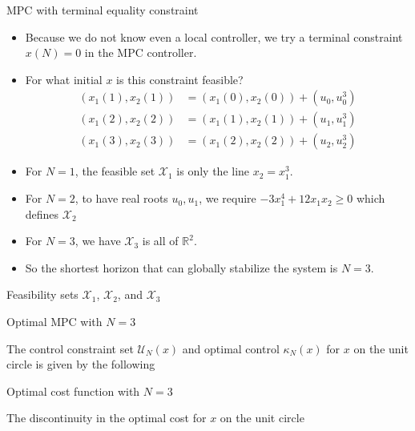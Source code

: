 \documentclass{beamer}
\newcommand{\bbR}{\mathbb{R}}
\begin{document}
\begin{frame}{MPC with terminal equality constraint}

\begin{itemize}
\item Because we do \alert{not} know even a \alert{local controller}, we try a terminal
constraint $x(N)=0$ in the MPC controller. 
\item For what initial $x$ is this constraint feasible?
\begin{align*}
(x_1(1), x_2(1)) &= (x_1(0), x_2(0)) + (u_0, u^3_0) \\
(x_1(2), x_2(2)) &= (x_1(1),x_2(1)) + (u_1, u_1^3) \\
(x_1(3), x_2(3)) &= (x_1(2), x_2(2)) + (u_2, u_2^3)
\end{align*}

\item  For $N=1$, the feasible set $\mathcal{X}_1$ is only the line $x_2 = x_1^3$. 
\item For $N=2$, to have real roots $u_0, u_1$, we require 
$−3x_1^4 + 12x_1x_2 \geq 0$ which defines $\mathcal{X}_2$
\item For $N=3$, we have $\mathcal{X}_3$ is all of $\bbR^2$. 
\item So the shortest horizon that can globally stabilize the system
  is $N=3$.
\end{itemize}
\end{frame}


\begin{frame}{Feasibility sets $\mathcal{X}_1$, $\mathcal{X}_2$, and
  $\mathcal{X}_3$}
\centerline{\resizebox{0.8\textwidth}{!}{}}

\end{frame}


\begin{frame}{Optimal MPC with $N=3$}

The control constraint set $\mathcal{U}_N(x)$  and optimal
control $\kappa_N(x)$ for $x$ on the unit
circle is given by the following \citep[p. 105]{rawlings:mayne:2009} 

\centerline{\resizebox{0.8\textwidth}{!}{}}

\end{frame}


\begin{frame}{Optimal cost function with $N=3$}

The discontinuity in the optimal cost for $x$ on  the unit circle

\centerline{\resizebox{0.8\textwidth}{!}{}}

\end{frame}
\end{document}
